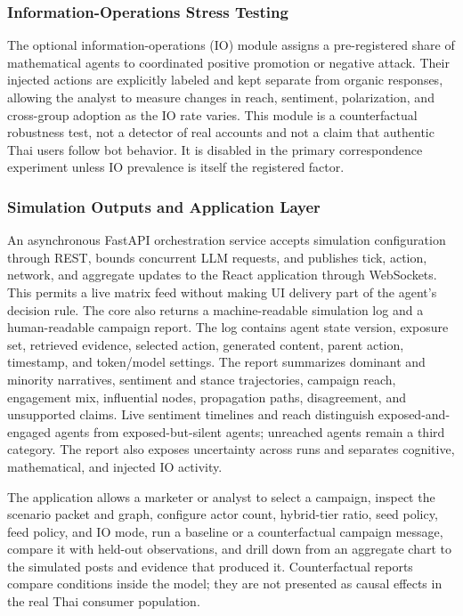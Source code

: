 \documentclass[conference]{IEEEtran}
\begin{document}
\subsubsection{Information-Operations Stress Testing}

The optional information-operations (IO) module assigns a pre-registered share
of mathematical agents to coordinated positive promotion or negative attack.
Their injected actions are explicitly labeled and kept separate from organic
responses, allowing the analyst to measure changes in reach, sentiment,
polarization, and cross-group adoption as the IO rate varies. This module is a
counterfactual robustness test, not a detector of real accounts and not a claim
that authentic Thai users follow bot behavior. It is disabled in the primary
correspondence experiment unless IO prevalence is itself the registered factor.

\subsubsection{Simulation Outputs and Application Layer}

An asynchronous FastAPI orchestration service accepts simulation configuration
through REST, bounds concurrent LLM requests, and publishes tick, action,
network, and aggregate updates to the React application through WebSockets.
This permits a live matrix feed without making UI delivery part of the agent's
decision rule. The core also returns a machine-readable simulation log and a
human-readable campaign report. The
log contains agent state version, exposure set, retrieved evidence, selected
action, generated content, parent action, timestamp, and token/model settings.
The report summarizes dominant and minority narratives, sentiment and stance
trajectories, campaign reach, engagement mix, influential nodes, propagation
paths, disagreement, and unsupported claims. Live sentiment timelines and
reach distinguish exposed-and-engaged agents from exposed-but-silent agents;
unreached agents remain a third category. The report also exposes uncertainty
across runs and separates cognitive, mathematical, and injected IO activity.

The application allows a marketer or analyst to select a campaign, inspect the
scenario packet and graph, configure actor count, hybrid-tier ratio, seed
policy, feed policy, and IO mode, run a baseline or a counterfactual campaign
message, compare it with held-out
observations, and drill down from an aggregate chart to the simulated posts
and evidence that produced it. Counterfactual reports compare conditions
inside the model; they are not presented as causal effects in the real Thai
consumer population.
\end{document}
